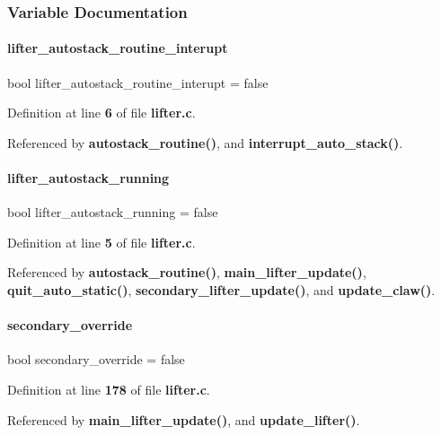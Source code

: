 \subsubsection{Variable Documentation}
\mbox{\label{lifter_8c_afbf11bb950aeb7975e91d0675a0820bc}} 
\paragraph{lifter\+\_\+autostack\+\_\+routine\+\_\+interupt}
{\footnotesize\ttfamily bool lifter\+\_\+autostack\+\_\+routine\+\_\+interupt = false\hspace{0.3cm}{\ttfamily [static]}}



Definition at line \textbf{ 6} of file \textbf{ lifter.\+c}.



Referenced by \textbf{ autostack\+\_\+routine()}, and \textbf{ interrupt\+\_\+auto\+\_\+stack()}.

\mbox{\label{lifter_8c_ae1fc3deab25f0b9e6f636bb83e9bf5c2}} 
\paragraph{lifter\+\_\+autostack\+\_\+running}
{\footnotesize\ttfamily bool lifter\+\_\+autostack\+\_\+running = false}



Definition at line \textbf{ 5} of file \textbf{ lifter.\+c}.



Referenced by \textbf{ autostack\+\_\+routine()}, \textbf{ main\+\_\+lifter\+\_\+update()}, \textbf{ quit\+\_\+auto\+\_\+static()}, \textbf{ secondary\+\_\+lifter\+\_\+update()}, and \textbf{ update\+\_\+claw()}.

\mbox{\label{lifter_8c_ad0dce62ab81a71d1c53831e375cde64c}} 
\paragraph{secondary\+\_\+override}
{\footnotesize\ttfamily bool secondary\+\_\+override = false\hspace{0.3cm}{\ttfamily [static]}}



Definition at line \textbf{ 178} of file \textbf{ lifter.\+c}.



Referenced by \textbf{ main\+\_\+lifter\+\_\+update()}, and \textbf{ update\+\_\+lifter()}.

